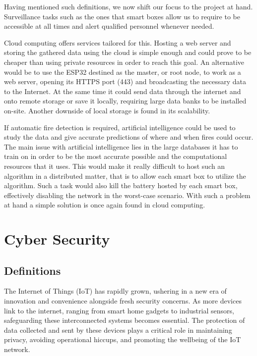 \documentclass[11pt]{article}
\begin{document}
\par \vspace{0.5 cm}

Having mentioned such definitions, we now shift our focus to the project at hand. Surveillance tasks such as the ones that smart boxes allow us to require to be accessible at all times and alert qualified personnel whenever needed. \par \vspace{0.5 cm}

Cloud computing offers services tailored for this. Hosting a web server and storing the gathered data using the cloud is simple enough and could prove to be cheaper than using private resources in order to reach this goal. An alternative would be to use the ESP32 destined as the master, or root node, to work as a web server, opening its HTTPS port (443) and broadcasting the necessary data to the Internet. At the same time it could send data through the internet and onto remote storage or save it locally, requiring large data banks to be installed on-site. Another downside of local storage is found in its scalability. \par \vspace{0.5 cm}

If automatic fire detection is required, artificial intelligence could be used to study the data and give accurate predictions of where and when fires could occur. The main issue with artificial intelligence lies in the large databases it has to train on in order to be the most accurate possible and the computational resources that it uses. This would make it really difficult to host such an algorithm in a distributed matter, that is to allow each smart box to utilize the algorithm. Such a task would also kill the battery hosted by each smart box, effectively disabling the network in the worst-case scenario. With such a problem at hand a simple solution is once again found in cloud computing. \par \vspace{0.5 cm}

\section{Cyber Security}

\subsection{Definitions}
The Internet of Things (IoT) has rapidly grown, ushering in a new era of innovation and convenience alongside fresh security concerns. As more devices link to the internet, ranging from smart home gadgets to industrial sensors, safeguarding these interconnected systems becomes essential. The protection of data collected and sent by these devices plays a critical role in maintaining privacy, avoiding operational hiccups, and promoting the wellbeing of the IoT network. \par \vspace{0.5 cm}
\end{document}
